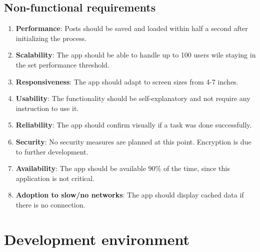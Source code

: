 \documentclass[conference]{IEEEtran}
\numberwithin{figure}{subsection}
\begin{document}
\subsection{Non-functional requirements}

\begin{enumerate}

 \item \textbf{Performance}: Posts should be saved and loaded within half a second after initializing the process.\\

 \item \textbf{Scalability}: The app should be able to handle up to 100 users wile staying in the set performance threshold.\\

 \item \textbf{Responsiveness}: The app should adapt to screen sizes from 4-7 inches.\\

 \item \textbf{Usability}: The functionality should be self-explanatory and not require any instruction to use it.\\

 \item \textbf{Reliability}: The app should confirm visually if a task was done successfully.\\

 \item \textbf{Security}: No security measures are planned at this point. Encryption is due to further development.\\

 \item \textbf{Availability}: The app should be available 90\% of the time, since this application is not critical.\\

 \item \textbf{Adoption to slow/no networks}: The app should display cached data if there is no connection.\\

\end{enumerate}


\section{Development environment}
\end{document}
